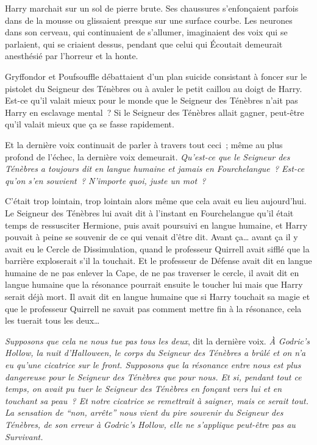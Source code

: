 Harry marchait sur un sol de pierre brute. Ses chaussures s'enfonçaient parfois dans de la mousse ou glissaient presque sur une surface courbe. Les neurones dans son cerveau, qui continuaient de s'allumer, imaginaient des voix qui se parlaient, qui se criaient dessus, pendant que celui qui Écoutait demeurait anesthésié par l'horreur et la honte.

Gryffondor et Poufsouffle débattaient d'un plan suicide consistant à foncer sur le pistolet du Seigneur des Ténèbres ou à avaler le petit caillou au doigt de Harry. Est-ce qu'il valait mieux pour le monde que le Seigneur des Ténèbres n'ait pas Harry en esclavage mental~? Si le Seigneur des Ténèbres allait gagner, peut-être qu'il valait mieux que ça se fasse rapidement.

Et la dernière voix continuait de parler à travers tout ceci~; même au plus profond de l'échec, la dernière voix demeurait. \emph{Qu'est-ce que le Seigneur des Ténèbres a toujours dit en langue humaine et jamais en Fourchelangue~? Est-ce qu'on s'en souvient~? N'importe quoi, juste un mot~?}

C'était trop lointain, trop lointain alors même que cela avait eu lieu aujourd'hui. Le Seigneur des Ténèbres lui avait dit à l'instant en Fourchelangue qu'il était temps de ressusciter Hermione, puis avait poursuivi en langue humaine, et Harry pouvait à peine se souvenir de ce qui venait d'être dit. Avant ça… avant ça il y avait eu le Cercle de Dissimulation, quand le professeur Quirrell avait sifflé que la barrière exploserait s'il la touchait. Et le professeur de Défense avait dit en langue humaine de ne pas enlever la Cape, de ne pas traverser le cercle, il avait dit en langue humaine que la résonance pourrait ensuite le toucher lui mais que Harry serait déjà mort. Il avait dit en langue humaine que si Harry touchait sa magie et que le professeur Quirrell ne savait pas comment mettre fin à la résonance, cela les tuerait tous les deux…

\emph{Supposons que cela ne nous tue pas tous les deux}, dit la dernière voix. \emph{À Godric's Hollow, la nuit d'Halloween, le corps du Seigneur des Ténèbres a brûlé et on n'a eu qu'une cicatrice sur le front. Supposons que la résonance entre nous est plus dangereuse pour le Seigneur des Ténèbres que pour nous. Et si, pendant tout ce temps, on avait pu tuer le Seigneur des Ténèbres en fonçant vers lui et en touchant sa peau~? Et notre cicatrice se remettrait à saigner, mais ce serait tout. La sensation de “non, arrête” nous vient du pire souvenir du Seigneur des Ténèbres, de son erreur à Godric's Hollow, elle ne s'applique peut-être pas au Survivant.}

